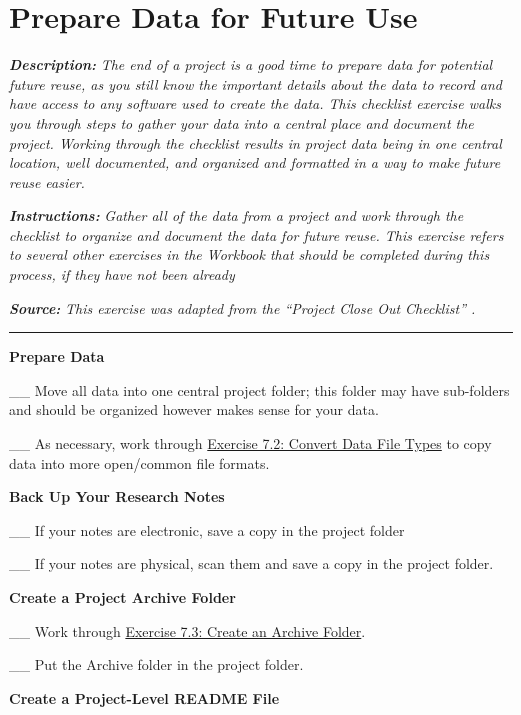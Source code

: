 \documentclass[
]{book}
\begin{document}
\hypertarget{future-use}{%
\section{Prepare Data for Future Use}\label{future-use}}

\textbf{\emph{Description:}} \emph{The end of a project is a good time to prepare data for potential future reuse, as you still know the important details about the data to record and have access to any software used to create the data. This checklist exercise walks you through steps to gather your data into a central place and document the project. Working through the checklist results in project data being in one central location, well documented, and organized and formatted in a way to make future reuse easier.}

\textbf{\emph{Instructions:}} \emph{Gather all of the data from a project and work through the checklist to organize and document the data for future reuse. This exercise refers to several other exercises in the Workbook that should be completed during this process, if they have not been already}

\textbf{\emph{Source:}} \emph{This exercise was adapted from the ``Project Close Out Checklist'' \citep{briney_project_2020}.}

\begin{center}\rule{0.5\linewidth}{0.5pt}\end{center}

\textbf{Prepare Data}

\_\_ Move all data into one central project folder; this folder may have sub-folders and should be organized however makes sense for your data.

\_\_ As necessary, work through \protect\hyperlink{file-type}{Exercise 7.2: Convert Data File Types} to copy data into more open/common file formats.

\textbf{Back Up Your Research Notes}

\_\_ If your notes are electronic, save a copy in the project folder

\_\_ If your notes are physical, scan them and save a copy in the project folder.

\textbf{Create a Project Archive Folder}

\_\_ Work through \protect\hyperlink{archive-folder}{Exercise 7.3: Create an Archive Folder}.

\_\_ Put the Archive folder in the project folder.

\textbf{Create a Project-Level README File}
\end{document}

